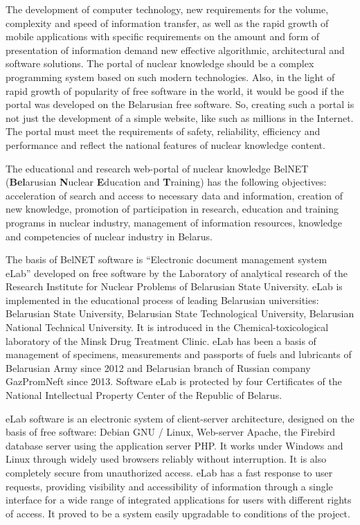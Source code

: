 \documentclass[12pt]{article}
\begin{document}
The development of computer technology, new requirements for the
volume, complexity and speed of information transfer, as well as
the rapid growth of mobile applications with specific requirements
on the amount and form of presentation of information demand new
effective algorithmic, architectural and software solutions. The
portal of nuclear knowledge should be a complex programming system
based on such modern technologies. Also, in the light of rapid
growth of popularity of free software in the world, it would be
good if the portal was developed on the Belarusian free software.
So, creating such a portal is not just the development of a simple
website, like such as millions in the Internet. The portal must
meet the requirements of safety, reliability, efficiency and
performance and reflect the national features of nuclear knowledge
content.

The educational and research web-portal of nuclear knowledge
BelNET ({\bf Bel}arusian {\bf N}uclear {\bf E}ducation and {\bf
T}raining) has the following objectives: acceleration of search
and access to necessary data and information, creation of new
knowledge, promotion of participation in research, education and
training programs in nuclear industry, management of information
resources, knowledge and competencies of nuclear industry in
Belarus.

The basis of BelNET software is ``Electronic document management
system eLab''\cite{MMA} developed on free software by the
Laboratory of analytical research of the Research Institute for
Nuclear Problems of Belarusian State University. eLab is
implemented in the educational process of leading Belarusian
universities: Belarusian State University, Belarusian State
Technological University, Belarusian National Technical
University. It is introduced in the Chemical-toxicological
laboratory of the Minsk Drug Treatment Clinic. eLab has been a
basis of management of specimens, measurements and passports of
fuels and lubricants of Belarusian Army since 2012 and Belarusian
branch of Russian company GazPromNeft since 2013. Software eLab is
protected by four Certificates of the National Intellectual
Property Center of the Republic of Belarus.

eLab software is an electronic system of client-server
architecture, designed on the basis of free software: Debian GNU /
Linux, Web-server Apache, the Firebird database server using the
application server PHP. It works under Windows and Linux through
widely used browsers reliably without interruption. It is also
completely secure from unauthorized access. eLab has a fast
response to user requests, providing visibility and accessibility
of information through a single interface for a wide range of
integrated applications for users with different rights of access.
It proved to be a system easily upgradable to conditions of the
project.
\end{document}
